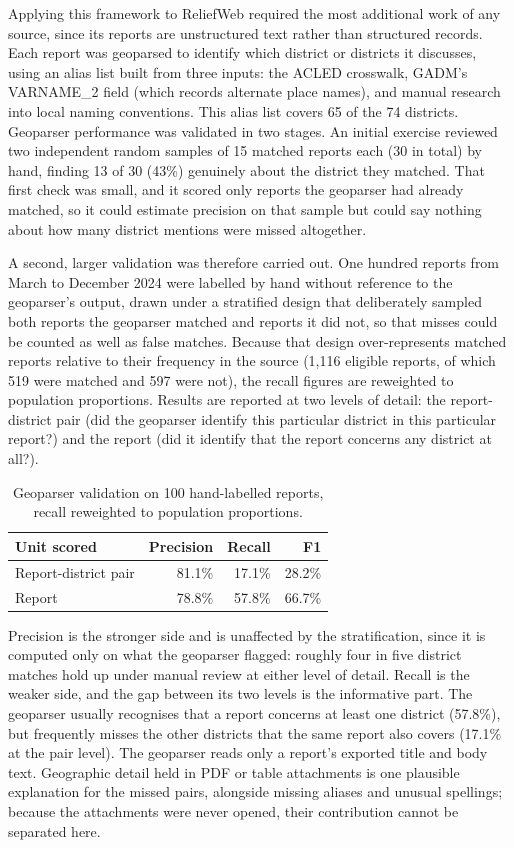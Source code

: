 \documentclass[12pt,a4paper]{article}
\begin{document}
Applying this framework to ReliefWeb required the most additional work of any source, since its reports are unstructured text rather than structured records. Each report was geoparsed to identify which district or districts it discusses, using an alias list built from three inputs: the ACLED crosswalk, GADM's VARNAME\_2 field (which records alternate place names), and manual research into local naming conventions. This alias list covers 65 of the 74 districts. Geoparser performance was validated in two stages. An initial exercise reviewed two independent random samples of 15 matched reports each (30 in total) by hand, finding 13 of 30 (43\%) genuinely about the district they matched. That first check was small, and it scored only reports the geoparser had already matched, so it could estimate precision on that sample but could say nothing about how many district mentions were missed altogether.

A second, larger validation was therefore carried out. One hundred reports from March to December 2024 were labelled by hand without reference to the geoparser's output, drawn under a stratified design that deliberately sampled both reports the geoparser matched and reports it did not, so that misses could be counted as well as false matches. Because that design over-represents matched reports relative to their frequency in the source (1,116 eligible reports, of which 519 were matched and 597 were not), the recall figures are reweighted to population proportions. Results are reported at two levels of detail: the report-district pair (did the geoparser identify this particular district in this particular report?) and the report (did it identify that the report concerns any district at all?).

\begin{table}[h!]
\centering
\begin{tabular}{lrrr}
\toprule
\textbf{Unit scored} & \textbf{Precision} & \textbf{Recall} & \textbf{F1} \\
\midrule
Report-district pair & 81.1\% & 17.1\% & 28.2\% \\
Report & 78.8\% & 57.8\% & 66.7\% \\
\bottomrule
\end{tabular}
\caption{Geoparser validation on 100 hand-labelled reports, recall reweighted to population proportions.}
\label{tab:geoparser}
\end{table}

Precision is the stronger side and is unaffected by the stratification, since it is computed only on what the geoparser flagged: roughly four in five district matches hold up under manual review at either level of detail. Recall is the weaker side, and the gap between its two levels is the informative part. The geoparser usually recognises that a report concerns at least one district (57.8\%), but frequently misses the other districts that the same report also covers (17.1\% at the pair level). The geoparser reads only a report's exported title and body text. Geographic detail held in PDF or table attachments is one plausible explanation for the missed pairs, alongside missing aliases and unusual spellings; because the attachments were never opened, their contribution cannot be separated here.
\end{document}
